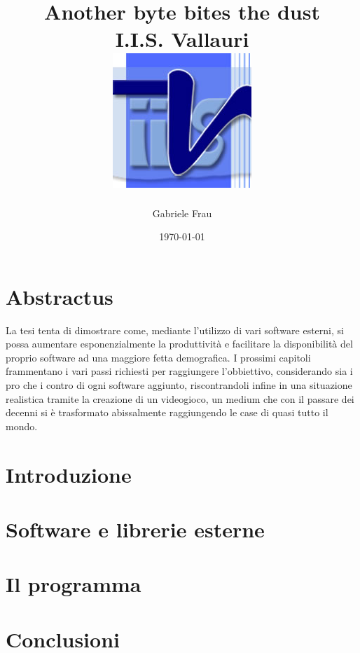 \documentclass[11pt]{report}
\title	{
		{Another byte bites the dust}	\\
		{\large I.I.S. Vallauri}\\
		{\includegraphics[scale=1.3]{vallauri.jpg}}
}
\author{Gabriele Frau}
\date{\today}
\begin{document}
\maketitle
\chapter*{Abstractus}
La tesi tenta di dimostrare come, mediante l'utilizzo di vari software esterni, si possa aumentare esponenzialmente la produttività e facilitare la disponibilità del proprio software ad una maggiore fetta demografica. I prossimi capitoli frammentano i vari passi richiesti per raggiungere l'obbiettivo, considerando sia i pro che i contro di ogni software aggiunto, riscontrandoli infine in una situazione realistica tramite la creazione di un videogioco, un medium che con il passare dei decenni si è trasformato abissalmente raggiungendo le case di quasi tutto il mondo.

\tableofcontents
\chapter{Introduzione}

\chapter{Software e librerie esterne}


\chapter{Il programma}



\chapter{Conclusioni}

\end{document}
